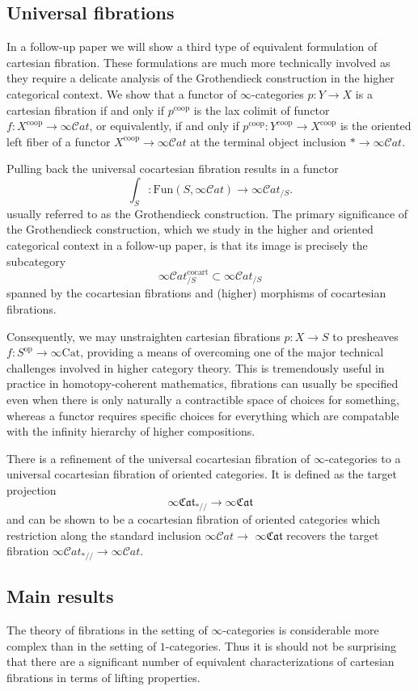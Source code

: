 \documentclass[10pt,oneside]{article}
\numberwithin{equation}{section} %
\numberwithin{figure}{section} %
\theoremstyle{plain}
\theoremstyle{definition}
\newcommand{\op}{\mathrm{op}}
\newcommand{\Cat}{\mathrm{Cat}}
\newcommand{\Fun}{\mathrm{Fun}}
\newcommand{\cocart}{{\mathrm{cocart}}}
\newcommand{\coop}{\mathrm{coop}}
\newcommand{\scat}{\mathcal{C}\mathit{at}}
\newcommand{\fcat}{\mathfrak{Cat}}
\begin{document}
\subsection{Universal fibrations}
In a follow-up paper \cite{OrientedGrothendieck2026} we will show a third type of equivalent formulation of cartesian fibration.
These formulations are much more technically involved as they require a delicate analysis of the Grothendieck construction in the higher categorical context.
We show that a functor of $\infty$-categories
$p:Y\to X$ is a cartesian fibration if and only if $p^{\coop}$ is the lax colimit of functor $f:X^{\coop}\to\infty\scat$, or equivalently, if and only if
$p^{\coop}:Y^{\coop}\to X^{\coop}$ is the oriented left fiber of a functor $X^{\coop}\to\infty\scat$ at the terminal object inclusion $*\to\infty\scat$.

Pulling back the universal cocartesian fibration results in a functor
\[
\int_S:\Fun(S,\infty\scat)\to\infty\scat_{/S}.
\]
usually referred to as the Grothendieck construction.
The primary significance of the Grothendieck construction, which we study in the higher and oriented categorical context in a follow-up paper, is that its image is precisely the subcategory
\[
\infty\scat^{\cocart}_{/S}\subset\infty\scat_{/S}
\]
spanned by the cocartesian fibrations and (higher) morphisms of cocartesian fibrations.

Consequently, we may unstraighten cartesian fibrations $p:X\to S$ to presheaves $f:S^{\op}\to\infty\Cat$, providing a means of overcoming one of the major technical challenges involved in higher category theory.
This is tremendously useful in practice in homotopy-coherent mathematics, fibrations can usually be specified even when there is only naturally a contractible space of choices for something, whereas a functor requires specific choices for everything which are compatable with the infinity hierarchy of higher compositions.

There is a refinement of the universal cocartesian fibration of $\infty$-categories to a universal cocartesian fibration of oriented categories.
It is defined as the target projection
\[
\infty\fcat_{\ast//}\to\infty\fcat
\]
and can be shown to be a cocartesian fibration of oriented categories which restriction along the standard inclusion $\infty\scat\to$ $\infty\fcat$ recovers the target fibration $\infty\scat_{\ast//}\to\infty\scat$.



\subsection{Main results}
The theory of fibrations in the setting of $\infty$-categories is considerable more complex than in the setting of $1$-categories.
Thus it is should not be surprising that there are a significant number of equivalent characterizations of cartesian fibrations in terms of lifting properties.
\end{document}
